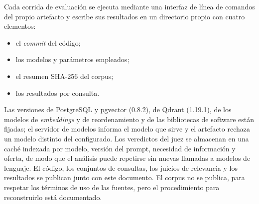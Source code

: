 Cada corrida de evaluación se ejecuta mediante una interfaz de línea de comandos del propio artefacto y escribe sus resultados en un directorio propio con cuatro elementos:
\begin{itemize}
    \item el \textit{commit} del código;
    \item los modelos y parámetros empleados;
    \item el resumen SHA-256 del corpus;
    \item los resultados por consulta.
\end{itemize}
Las versiones de PostgreSQL y pgvector (0.8.2), de Qdrant (1.19.1), de los modelos de \textit{embeddings} y de reordenamiento y de las bibliotecas de software están fijadas; el servidor de modelos informa el modelo que sirve y el artefacto rechaza un modelo distinto del configurado. Los veredictos del juez se almacenan en una caché indexada por modelo, versión del prompt, necesidad de información y oferta, de modo que el análisis puede repetirse sin nuevas llamadas a modelos de lenguaje. El código, los conjuntos de consultas, los juicios de relevancia y los resultados se publican junto con este documento. El corpus no se publica, para respetar los términos de uso de las fuentes, pero el procedimiento para reconstruirlo está documentado.
